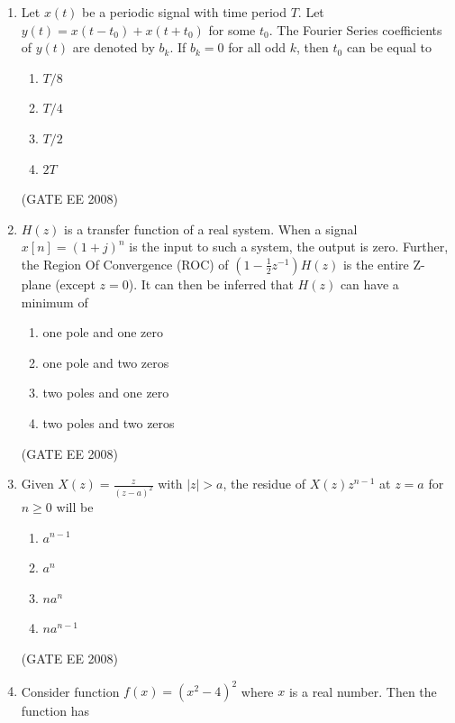 \documentclass[journal,12pt,onecolumn]{IEEEtran}
\theoremstyle{remark}
\begin{document}
\begin{enumerate}[start=1, label=Q.\arabic*]
\item Let $x(t)$ be a periodic signal with time period $T$. Let $y(t) = x(t-t_0)+x(t+t_0)$ for some $t_0$. The Fourier Series coefficients of $y(t)$ are denoted by $b_k$. If $b_k=0$ for all odd $k$, then $t_0$ can be equal to

\begin{multicols}{4}
\begin{enumerate}[label=(\Alph*)]
    \item $T/8$
    \item $T/4$
    \item $T/2$
    \item $2T$
\end{enumerate}
\end{multicols}
\hfill (GATE EE 2008)


\item $H(z)$ is a transfer function of a real system. When a signal $x[n] = (1+j)^{n}$ is the input to such a system, the output is zero. Further, the Region Of Convergence (ROC) of $\left(1-\frac{1}{2}z^{-1}\right) H(z)$ is the entire Z-plane (except $z=0$). It can then be inferred that $H(z)$ can have a minimum of

\begin{enumerate}[label=(\Alph*)]
    \item one pole and one zero
    \item one pole and two zeros
    \item two poles and one zero
    \item two poles and two zeros
\end{enumerate}
\hfill (GATE EE 2008)


\item Given $X(z)=\frac{z}{(z-a)^2}$ with $|z|>a$, the residue of $X(z)z^{n-1}$ at $z=a$ for $n \ge 0$ will be

\begin{multicols}{4}
\begin{enumerate}[label=(\Alph*)]
    \item $a^{n-1}$
    \item $a^{n}$
    \item $na^{n}$
    \item $na^{n-1}$
\end{enumerate}
\end{multicols}
\hfill (GATE EE 2008)


\item Consider function $f(x)=(x^2-4)^2$ where $x$ is a real number. Then the function has


\end{enumerate}
\end{document}
